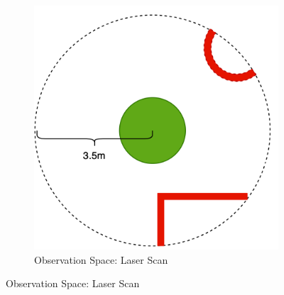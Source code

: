 \begin{figure}
\centering
\begin{subfigure}[b]{0.4\textwidth}
   \includegraphics[width=1\linewidth]{figures/observation_laser_scan_300.png}
   \caption{Observation Space: Laser Scan}
   \label{fig:observation-space-scan} 
\end{subfigure}


\end{figure}
